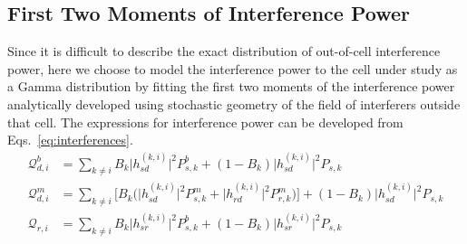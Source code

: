 \documentclass[titlepage]{article}
\begin{document}
\subsection{First Two Moments of Interference Power} Since it is difficult to describe the
exact distribution of out-of-cell interference power, here we
choose to model the interference power to the cell under study
as a Gamma distribution by fitting the first two moments of
the interference power analytically developed using stochastic
geometry of the field of interferers outside that cell.
The expressions for interference power can be developed from Eqs.~\ref{eq:interferences}. 
\begin{align}
\mathcal{Q}_{d,i}^b &= \sum_{k\neq i}B_k \Big |h_{sd}^{(k,i)}\Big|^2P_{s,k}^b + (1-B_k)\Big|h_{sd}^{(k,i)}\Big|^2P_{s,k} \\
\mathcal{Q}_{d,i}^m &= \sum_{k\neq i}\bigg[B_k\bigg(\Big|h_{sd}^{(k,i)}\Big|^2 P_{s,k}^m+\Big|h_{rd}^{(k,i)}\Big|^2 P_{r,k}^m\bigg)\bigg] + (1-B_k) \Big| h_{sd}^{(k,i)}\Big|^2 P_{s,k} \\
\mathcal{Q}_{r,i} &= \sum_{k\neq i}B_k \Big|h_{sr}^{(k,i)}\Big|^2P_{s,k}^b + (1-B_k)\Big|h_{sr}^{(k,i)}\Big|^2P_{s,k} 
\end{align}
\end{document}
